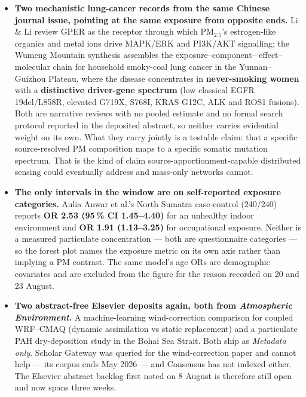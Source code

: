 \documentclass[10pt]{article}
\begin{document}
\begin{itemize}
\item \textbf{Two mechanistic lung-cancer records from the same Chinese journal issue,
pointing at the same exposure from opposite ends.} Li \& Li review GPER as the receptor
through which PM$_{2.5}$'s estrogen-like organics and metal ions drive MAPK/ERK and
PI3K/AKT signalling; the Wumeng Mountain synthesis assembles the exposure--component--
effect--molecular chain for household smoky-coal lung cancer in the Yunnan--Guizhou
Plateau, where the disease concentrates in \textbf{never-smoking women} with a
\textbf{distinctive driver-gene spectrum} (low classical EGFR 19del/L858R, elevated
G719X, S768I, KRAS G12C, ALK and ROS1 fusions). Both are narrative reviews with no
pooled estimate and no formal search protocol reported in the deposited abstract, so
neither carries evidential weight on its own. What they carry jointly is a testable
claim: that a specific source-resolved PM composition maps to a specific somatic
mutation spectrum. That is the kind of claim source-apportionment-capable distributed
sensing could eventually address and mass-only networks cannot.

\item \textbf{The only intervals in the window are on self-reported exposure
categories.} Aulia Anwar et al.'s North Sumatra case-control (240/240) reports
\textbf{OR 2.53 (95\,\% CI 1.45--4.40)} for an unhealthy indoor environment and
\textbf{OR 1.91 (1.13--3.25)} for occupational exposure. Neither is a measured
particulate concentration --- both are questionnaire categories --- so the forest plot
names the exposure metric on its own axis rather than implying a PM contrast. The
same model's age ORs are demographic covariates and are excluded from the figure for
the reason recorded on 20 and 23 August.

\item \textbf{Two abstract-free Elsevier deposits again, both from \textit{Atmospheric
Environment}.} A machine-learning wind-correction comparison for coupled WRF--CMAQ
(dynamic assimilation vs static replacement) and a particulate PAH dry-deposition study
in the Bohai Sea Strait. Both ship as \textit{Metadata only}. Scholar Gateway was queried
for the wind-correction paper and cannot help --- its corpus ends May 2026 --- and
Consensus has not indexed either. The Elsevier abstract backlog first noted on 8 August
is therefore still open and now spans three weeks.
\end{itemize}

\vspace{3mm}
\end{document}

